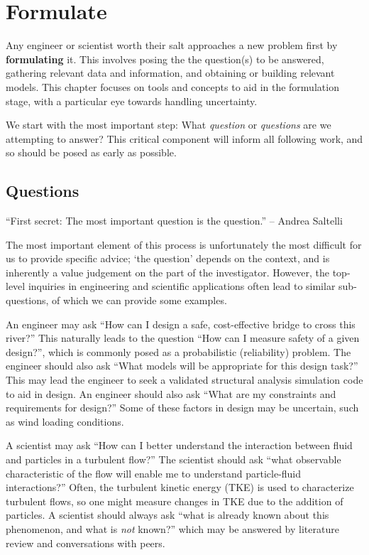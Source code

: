 \documentclass[../primer.tex]{subfiles}
\begin{document}
\chapter{Formulate} \label{ch3:formulate}
Any engineer or scientist worth their salt approaches a new problem first by
\textbf{formulating} it. This involves posing the the question(s) to be
answered, gathering relevant data and information, and obtaining or building
relevant models. This chapter focuses on tools and concepts to aid in the
formulation stage, with a particular eye towards handling uncertainty.

We start with the most important step: What \emph{question} or \emph{questions}
are we attempting to answer? This critical component will inform all following
work, and so should be posed as early as possible.

\section{Questions} \label{sec:ch3-questions}
``First secret: The most important question is the question.'' -- Andrea
Saltelli\cite{saltelli2000sensitivity}

The most important element of this process is unfortunately the most difficult
for us to provide specific advice; `the question' depends on the context, and is
inherently a value judgement on the part of the investigator. However, the
top-level inquiries in engineering and scientific applications often lead to
similar sub-questions, of which we can provide some examples.

An engineer may ask ``How can I design a safe, cost-effective bridge to cross
this river?'' This naturally leads to the question ``How can I measure safety of
a given design?'', which is commonly posed as a probabilistic (reliability)
problem. The engineer should also ask ``What models will be appropriate for this
design task?'' This may lead the engineer to seek a validated structural
analysis simulation code to aid in design. An engineer should also ask ``What
are my constraints and requirements for design?'' Some of these factors in
design may be uncertain, such as wind loading conditions.

A scientist may ask ``How can I better understand the interaction between fluid
and particles in a turbulent flow?'' The scientist should ask ``what observable
characteristic of the flow will enable me to understand particle-fluid
interactions?'' Often, the turbulent kinetic energy (TKE) is used to
characterize turbulent flows, so one might measure changes in TKE due to the
addition of particles. A scientist should always ask ``what is already known
about this phenomenon, and what is \emph{not} known?'' which may be answered by
literature review and conversations with peers.
\end{document}
